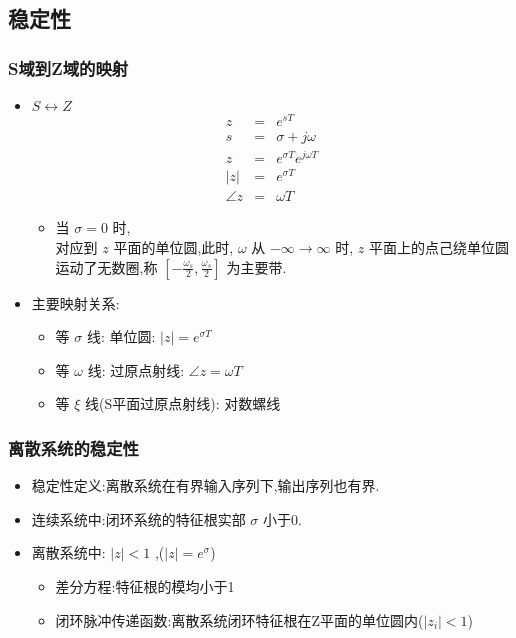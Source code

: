 \documentclass[table]{article}
\begin{document}
\subsection{稳定性}
\label{sec-5-1}
\begin{frame}
\frametitle{S域到Z域的映射}
\label{sec-5-1-1}
\begin{itemize}

\item $S\leftrightarrow Z$
\label{sec-5-1-1-1}%
\begin{eqnarray*}
z & = & e^{sT}\\
s &=& \sigma+j\omega \\
z &=& e^{\sigma T}e^{j\omega T} \\
|z| &=& e^{\sigma T} \\
\angle z &=& \omega T
\end{eqnarray*}
\begin{itemize}

\item 当  $\sigma=0$  时,\\
\label{sec-5-1-1-1-1}%
对应到  $z$  平面的单位圆,此时,  $\omega$  从  $-\infty\rightarrow\infty$ 时,  $z$  平面上的点己绕单位圆运动了无数圈,称  $[-\frac{\omega_s}{2},\frac{\omega_s}{2}]$  为主要带.

\end{itemize} %

\item 主要映射关系:
\label{sec-5-1-1-2}%
\begin{itemize}
\item 等  $\sigma$  线: 单位圆:   $|z|=e^{\sigma T}$
\item 等  $\omega$  线: 过原点射线:  $\angle z=\omega T$
\item 等  $\xi$  线(S平面过原点射线): 对数螺线
\end{itemize}

\end{itemize} %
\end{frame}
\begin{frame}
\frametitle{离散系统的稳定性}
\label{sec-5-1-2}

\begin{itemize}
\item 稳定性定义:离散系统在有界输入序列下,输出序列也有界.
\item <2->连续系统中:闭环系统的特征根实部 $\sigma$  小于0.
\item <3->离散系统中:  $|z|<1$ ,($|z|=e^{\sigma}$)
\begin{itemize}
\item 差分方程:特征根的模均小于1
\item 闭环脉冲传递函数:离散系统闭环特征根在Z平面的单位圆内($|z_i|<1$)
\end{itemize}
\end{itemize}
\end{frame}
\end{document}
